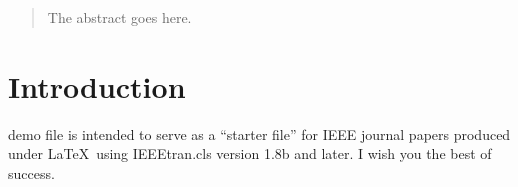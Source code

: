 \documentclass[a4paper,journal]{IEEEtran}
\begin{document}







\maketitle

\begin{abstract}
The abstract goes here.
\end{abstract}







%
\IEEEpeerreviewmaketitle



\section{Introduction}
%
%
%
%
 demo file is intended to serve as a ``starter file''
for IEEE journal papers produced under \LaTeX\ using
IEEEtran.cls version 1.8b and later.
I wish you the best of success.
\end{document}
